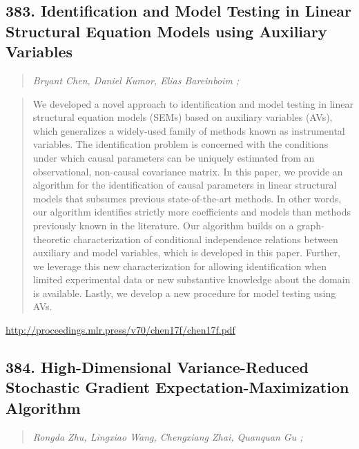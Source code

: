 \documentclass{article}
\begin{document}
\subsection{383. Identification and Model Testing in Linear Structural Equation Models using Auxiliary Variables}

\begin{quote}
\footnotesize{\textit{Bryant Chen, Daniel Kumor, Elias Bareinboim ;}}

\end{quote}

\begin{quote}
    We developed a novel approach to identification and model testing in linear structural equation models (SEMs) based on auxiliary variables (AVs), which generalizes a widely-used family of methods known as instrumental variables. The identification problem is concerned with the conditions under which causal parameters can be uniquely estimated from an observational, non-causal covariance matrix. In this paper, we provide an algorithm for the identification of causal parameters in linear structural models that subsumes previous state-of-the-art methods. In other words, our algorithm identifies strictly more coefficients and models than methods previously known in the literature. Our algorithm builds on a graph-theoretic characterization of conditional independence relations between auxiliary and model variables, which is developed in this paper. Further, we leverage this new characterization for allowing identification when limited experimental data or new substantive knowledge about the domain is available. Lastly, we develop a new procedure for model testing using AVs.  
\end{quote}

\href{http://proceedings.mlr.press/v70/chen17f/chen17f.pdf}{http://proceedings.mlr.press/v70/chen17f/chen17f.pdf}

\subsection{384. High-Dimensional Variance-Reduced Stochastic Gradient Expectation-Maximization Algorithm}

\begin{quote}
\footnotesize{\textit{Rongda Zhu, Lingxiao Wang, Chengxiang Zhai, Quanquan Gu ;}}

\end{quote}
\end{document}
